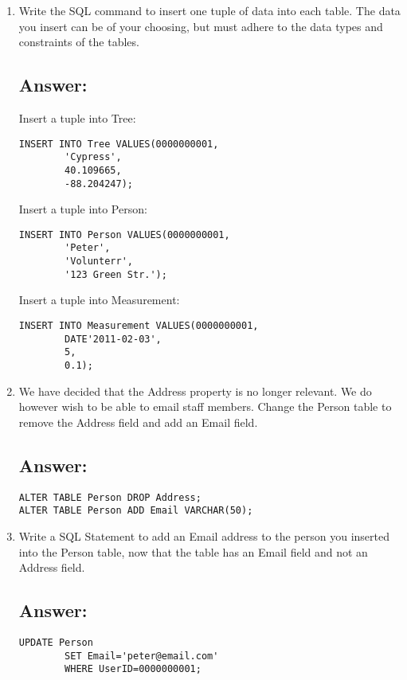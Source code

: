 \documentclass[letter,11pt]{article}
\begin{document}
\begin{enumerate}
\item Write the SQL command to insert one tuple of data into each table. The data you insert can be of your choosing, but must adhere to the data types and constraints of the tables.
\subsection*{Answer:}

Insert a tuple into Tree:\\
\begin{lstlisting}[frame=single]
INSERT INTO Tree VALUES(0000000001,
        'Cypress',
        40.109665,
        -88.204247);
\end{lstlisting}

Insert a tuple into Person:\\
\begin{lstlisting}[frame=single]
INSERT INTO Person VALUES(0000000001,
        'Peter',
        'Volunterr',
        '123 Green Str.');
\end{lstlisting}

Insert a tuple into Measurement:\\
\begin{lstlisting}[frame=single]
INSERT INTO Measurement VALUES(0000000001,
        DATE'2011-02-03',
        5,
        0.1);
\end{lstlisting}

\item We have decided that the Address property is no longer relevant. We do however wish to be able to email staff members. Change the Person table to remove the Address field and add an Email field.
\subsection*{Answer:}
\begin{lstlisting}[frame=single]
ALTER TABLE Person DROP Address;
ALTER TABLE Person ADD Email VARCHAR(50);
\end{lstlisting}

\item Write a SQL Statement to add an Email address to the person you inserted into the Person table, now that the table has an Email field and not an Address field.
\subsection*{Answer:}
\begin{lstlisting}[frame=single]
UPDATE Person
        SET Email='peter@email.com'
        WHERE UserID=0000000001;
\end{lstlisting}

\end{enumerate}
\end{document}
